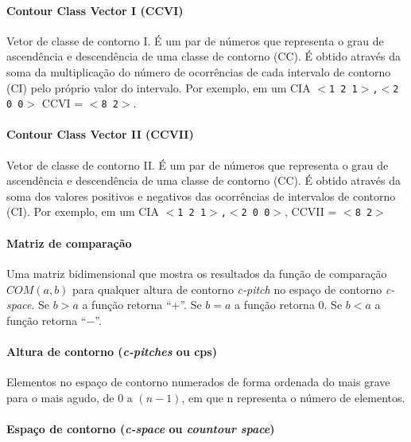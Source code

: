 \documentclass[12pt,brazil]{book}
\newcommand{\eng}[1]{\textit{#1}}
\begin{document}
\paragraph{Contour Class Vector I (CCVI)}
\label{sec:contour-class-vector-1}

Vetor de classe de contorno I. É um par de números que representa o
grau de ascendência e descendência de uma classe de contorno (CC). É
obtido através da soma da multiplicação do número de ocorrências de
cada intervalo de contorno (CI) pelo próprio valor do intervalo. Por
exemplo, em um CIA \texttt{$<$1 2 1$>$,$<$2 0 0$>$} CCVI =
\texttt{$<$8 2$>$}.

\paragraph{Contour Class Vector II (CCVII)}
\label{sec:contour-class-vector-2}

Vetor de classe de contorno II. É um par de números que representa o
grau de ascendência e descendência de uma classe de contorno (CC). É
obtido através da soma dos valores positivos e negativos das
ocorrências de intervalos de contorno (CI). Por exemplo, em um CIA
\texttt{$<$1 2 1$>$,$<$2 0 0$>$}, CCVII = \texttt{$<$8 2$>$}


\paragraph{Matriz de comparação}
\label{sec:matriz-de-comparacao}

Uma matriz bidimensional que mostra os resultados da função de
comparação $COM(a,b)$ para qualquer altura de contorno \eng{c-pitch}
no espaço de contorno \eng{c-space}. Se $b > a$ a função retorna
``$+$''. Se $b = a$ a função retorna $0$. Se $b < a$ a função retorna
``$-$''.

\paragraph{Altura de contorno (\eng{c-pitches} ou cps)}
\label{sec:altura-de-contorno}

Elementos no espaço de contorno numerados de forma ordenada do mais
grave para o mais agudo, de $0$ a $(n - 1)$, em que n representa o
número de elementos.

\paragraph{Espaço de contorno (\eng{c-space} ou \eng{countour space})}
\label{sec:espaco-de-contorno}
\end{document}
